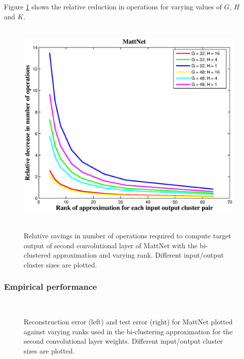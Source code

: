 Figure \ref{biclustering_ops_pic} shows the relative reduction in operations for varying values of $G$, $H$ and $K$.

\begin{figure}[t]
\centering
\mbox{
	\includegraphics[width=0.75\linewidth]{img/bicluster_ranks_vs_numops_mattnet.eps} 
}
\label{biclustering_ops_pic}
\caption{Relative savings in number of operations required to compute target output of second convolutional layer of MattNet with the bi-clustered approximation and varying rank. Different input/output cluster sizes are plotted.}
\end{figure}


\subsubsection{Empirical performance}

\begin{figure}[t]
\centering
\mbox{
}
\label{layer2recon_error_vs_rank}
\caption{Reconstruction error (left) and test error (right) for MattNet plotted against varying ranks used in the bi-clustering approximation for the second convolutional layer weights. Different input/output cluster sizes are plotted.}
\end{figure}
